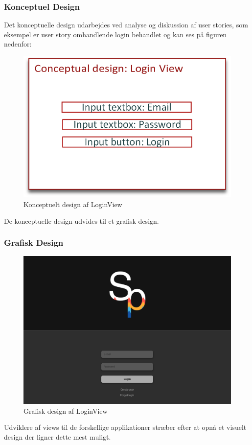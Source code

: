 \subsubsection{Konceptuel Design}
Det konceptuelle design udarbejdes ved analyse og diskussion af user stories, som eksempel er user story omhandlende login behandlet og kan ses på figuren nedenfor:

\begin{figure}
	\centering
	\includegraphics[width=0.5\linewidth]{figs/design/concuptuel_design_loginview}
	\caption{Konceptuelt design af LoginView}
	\label{fig:conceptualdesignview}
\end{figure}

De konceptuelle design udvides til et grafisk design.

\subsubsection{Grafisk Design}
\begin{figure}
	\centering
	\includegraphics[width=0.5\linewidth]{figs/design/DesktopHDLogin}
	\caption{Grafisk design af LoginView}
	\label{fig:graphicaldesign}
\end{figure}

Udviklere af views til de forskellige applikationer stræber efter at opnå et visuelt design der ligner dette mest muligt.
